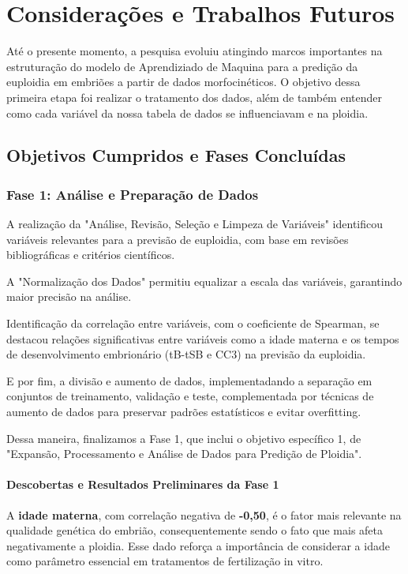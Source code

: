 \chapter[Considerações e Trabalhos Futuros]{Considerações e Trabalhos Futuros}

Até o presente momento, a pesquisa evoluiu atingindo marcos importantes na estruturação do modelo de Aprendiziado de Maquina para a predição da euploidia em embriões a partir de dados morfocinéticos. O objetivo dessa primeira etapa foi realizar o tratamento dos dados, além de também entender como cada variável da nossa tabela de dados se influenciavam e na ploidia. 

\section{Objetivos Cumpridos e Fases Concluídas}
\subsection{Fase 1: Análise e Preparação de Dados}
A realização da "Análise, Revisão, Seleção e Limpeza de Variáveis" identificou variáveis relevantes para a previsão de euploidia, com base em revisões bibliográficas e critérios científicos.

A "Normalização dos Dados" permitiu equalizar a escala das variáveis, garantindo maior precisão na análise.

Identificação da correlação entre variáveis, com o coeficiente de Spearman, se destacou relações significativas entre variáveis como a idade materna e os tempos de desenvolvimento embrionário (tB-tSB e CC3) na previsão da euploidia.

E por fim, a divisão e aumento de dados, implementadando a separação em conjuntos de treinamento, validação e teste, complementada por técnicas de aumento de dados para preservar padrões estatísticos e evitar overfitting.

Dessa maneira, finalizamos a Fase 1, que inclui o objetivo específico 1, de "Expansão, Processamento e Análise de Dados para Predição de Ploidia". 

\subsubsection{Descobertas e Resultados Preliminares da Fase 1}

A \textbf{idade materna}, com correlação negativa de \textbf{-0,50}, é o fator mais relevante na qualidade genética do embrião, consequentemente sendo o fato que mais afeta negativamente a ploidia. Esse dado reforça a importância de considerar a idade como parâmetro essencial em tratamentos de fertilização in vitro.

